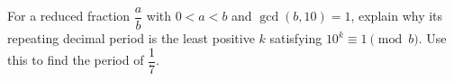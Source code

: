 For a reduced fraction $\dfrac{a}{b}$ with $0<a<b$ and $\gcd(b,10)=1$, explain why its repeating decimal period is the least positive $k$ satisfying $10^k\equiv1\pmod b$. Use this to find the period of $\dfrac{1}{7}$.
